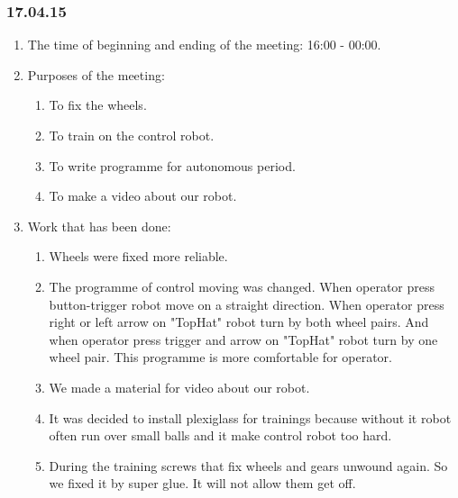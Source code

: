 \subsubsection{17.04.15}
\begin{enumerate}
	
	\item The time of beginning and ending of the meeting: 16:00 - 00:00.
	
	\item Purposes of the meeting: 
	\begin{enumerate}
		
		\item To fix the wheels.
		
		\item To train on the control robot.
		
		\item To write programme for autonomous period.
		
        \item To make a video about our robot.
		
	\end{enumerate}

	\item Work that has been done:
	\begin{enumerate}
		
		\item Wheels were fixed more reliable.
		
		\item The programme of control moving was changed. When operator press button-trigger robot move on a straight direction. When operator press right or left arrow on "TopHat" robot turn by both wheel pairs. And when operator press trigger and arrow on "TopHat" robot turn by one wheel pair. This programme is more comfortable for operator.
		
        \item We made a material for video about our robot.
        
        \item It was decided to install plexiglass for trainings because without it robot often run over small balls and it make control robot too hard.
        
        \item During the training screws that fix wheels and gears unwound again. So we fixed it by super glue. It will not allow them get off.
        
	\end{enumerate}
	

\end{enumerate}
